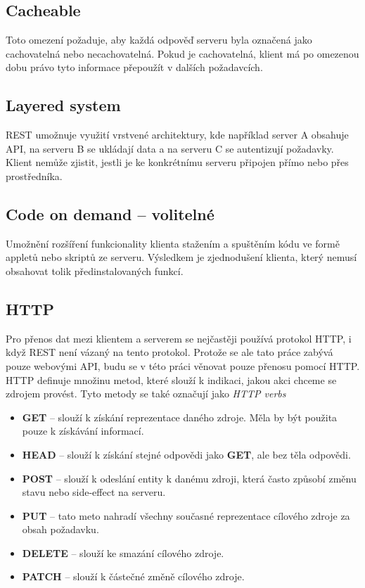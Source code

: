 \documentclass[thesis=M,czech]{FITthesis}[2019/12/23]
\begin{document}
\subsection{Cacheable}
Toto omezení požaduje, aby každá odpověď serveru byla označená jako cachovatelná nebo necachovatelná. Pokud je cachovatelná, klient má po omezenou dobu právo tyto informace přepoužít v dalších požadavcích.

\subsection{Layered system}
REST umožnuje využití vrstvené architektury, kde například server A obsahuje API, na serveru B se ukládají data a na serveru C se autentizují požadavky. Klient nemůže zjistit, jestli je ke konkrétnímu serveru připojen přímo nebo přes prostředníka.

\subsection{Code on demand -- volitelné}
Umožnění rozšíření funkcionality klienta stažením a spuštěním kódu ve formě appletů nebo skriptů ze serveru. Výsledkem je zjednodušení klienta, který nemusí obsahovat tolik předinstalovaných funkcí.

\subsection{HTTP}
Pro přenos dat mezi klientem a serverem se nejčastěji používá protokol HTTP, i když REST není vázaný na tento protokol. Protože se ale tato práce zabývá pouze webovými API, budu se v této práci věnovat pouze přenosu pomocí HTTP.
HTTP definuje množinu metod, které slouží k indikaci, jakou akci chceme se zdrojem provést. Tyto metody se také označují jako \textit{HTTP verbs} \cite{http_metods}

\begin{itemize}
    \item \textbf{GET} -- slouží k získání reprezentace daného zdroje. Měla by být použita pouze k získávání informací.
    \item \textbf{HEAD} -- slouží k získání stejné odpovědi jako \textbf{GET}, ale bez těla odpovědi.
    \item \textbf{POST} -- slouží k odeslání entity k danému zdroji, která často způsobí změnu stavu nebo side-effect na serveru.
    \item \textbf{PUT} -- tato meto nahradí všechny současné reprezentace cílového zdroje za obsah požadavku.
    \item \textbf{DELETE} -- slouží ke smazání cílového zdroje.
    \item \textbf{PATCH} -- slouží k částečné změně cílového zdroje.
\end{itemize}
\end{document}
